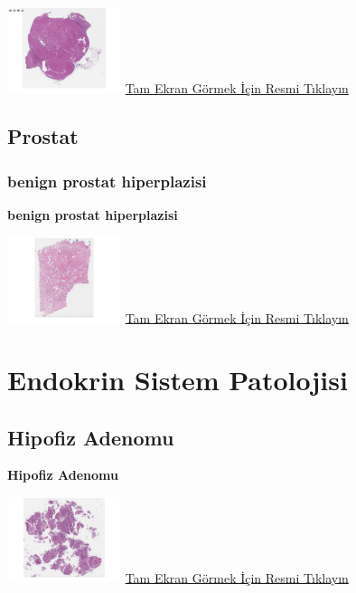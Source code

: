 \documentclass[
  letterpaper,
  DIV=11,
  numbers=noendperiod]{scrreprt}
\begin{document}
\href{https://images.patolojiatlasi.com/kidneyoncocytoma/HE.html}{\includegraphics[width=0.25\textwidth,height=\textheight]{./screenshots/thumbnail_kidneyoncocytoma.png}}
\href{https://images.patolojiatlasi.com/kidneyoncocytoma/HE.html}{Tam
Ekran Görmek İçin Resmi Tıklayın}

\hypertarget{sec-prostat}{%
\chapter{Prostat}\label{sec-prostat}}

\hypertarget{sec-benign-prostat-hiperplazisi}{%
\section{benign prostat
hiperplazisi}\label{sec-benign-prostat-hiperplazisi}}

\textbf{benign prostat hiperplazisi}

\href{https://images.patolojiatlasi.com/benign-prostate-hyperplasia/HE.html}{\includegraphics[width=0.25\textwidth,height=\textheight]{./screenshots/thumbnail_benign-prostate-hyperplasia.png}}
\href{https://images.patolojiatlasi.com/benign-prostate-hyperplasia/HE.html}{Tam
Ekran Görmek İçin Resmi Tıklayın}

\part{Endokrin Sistem Patolojisi}

\hypertarget{sec-hipofiz-adenomu}{%
\chapter{Hipofiz Adenomu}\label{sec-hipofiz-adenomu}}

\textbf{Hipofiz Adenomu}

\href{https://images.patolojiatlasi.com/pituitary-adenoma/HE.html}{\includegraphics[width=0.25\textwidth,height=\textheight]{./screenshots/thumbnail_pituitary-adenoma.png}}
\href{https://images.patolojiatlasi.com/pituitary-adenoma/HE.html}{Tam
Ekran Görmek İçin Resmi Tıklayın}
\end{document}
